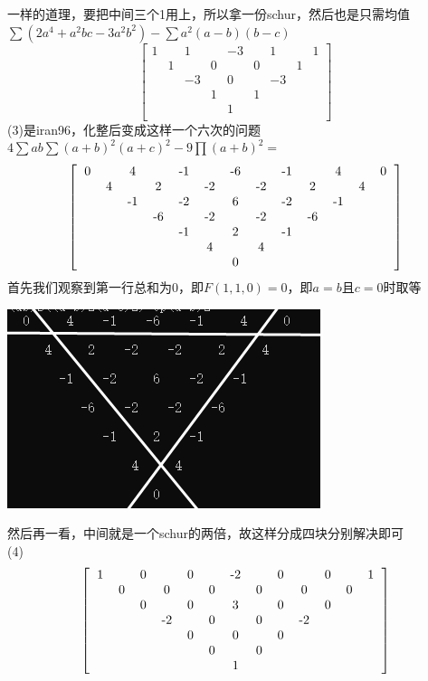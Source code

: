 \documentclass[UTF8]{ctexart}
\begin{document}
一样的道理，要把中间三个1用上，所以拿一份schur，然后也是只需均值\\
$ \displaystyle  \sum (2a^{4}+a^{2}bc-3a^{2}b^{2})-\displaystyle  \sum a^{2}(a-b)(b-c) $
\renewcommand*{\arraystretch}{1.732}\[\left[\begin{matrix}
	1& &1& &-3& &1& &1\\
	&1& &0& &0& &1&\\
	& &-3& &0& &-3& &\\
	& & &1& &1& & &\\
	& & & &1& & & &\\
\end{matrix}\right]\]
(3)是iran96，化整后变成这样一个六次的问题\\
$ 4\displaystyle \sum ab\displaystyle \sum (a+b)^{2}(a+c)^{2}-9\prod (a+b)^{2}= $
\renewcommand*{\arraystretch}{1.732}\[\left[\begin{matrix}
	\begin{tabular}{ccccccccccccc}
		0& &4& &-1& &-6& &-1& &4& &0\\
		&4& &2& &-2& &-2& &2& &4&\\
		& &-1& &-2& &6& &-2& &-1& &\\
		& & &-6& &-2& &-2& &-6& & &\\
		& & & &-1& &2& &-1& & & &\\
		& & & & &4& &4& & & & &\\
		& & & & & &0& & & & & &\\
	\end{tabular}
\end{matrix}\right]\]
首先我们观察到第一行总和为$ 0 $，即$ F(1,1,0)=0 $，即$ a=b $且$ c=0 $时取等
\begin{center}
	\includegraphics[width=0.4\linewidth]{220}
\end{center}
然后再一看，中间就是一个schur的两倍，故这样分成四块分别解决即可\\
(4)\renewcommand*{\arraystretch}{1.732}\[\left[\begin{matrix}
	\begin{tabular}{ccccccccccccc}
		1& &0& &0& &-2& &0& &0& &1\\
		&0& &0& &0& &0& &0& &0&\\
		& &0& &0& &3& &0& &0& &\\
		& & &-2& &0& &0& &-2& & &\\
		& & & &0& &0& &0& & & &\\
		& & & & &0& &0& & & & &\\
		& & & & & &1& & & & & &\\
	\end{tabular}
\end{matrix}\right]\]
\end{document}
